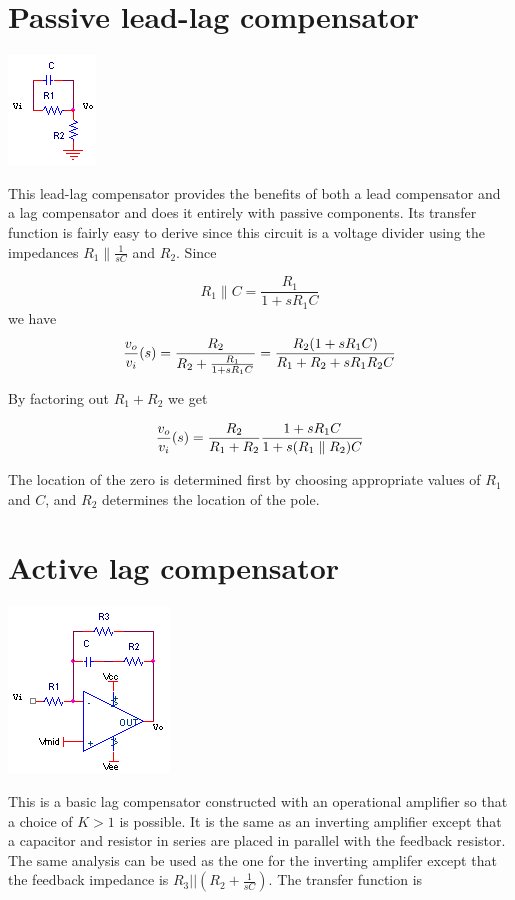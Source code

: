 \section{Passive lead-lag compensator}
\begin{center}
	\includegraphics{schematics/passiveleadlag.PNG}
\end{center}
This lead-lag compensator provides the benefits of both a lead compensator and a lag compensator and does it entirely with passive components. Its transfer function is fairly easy to derive since this circuit is a voltage divider using the impedances $R_1 \parallel \frac{1}{sC}$ and $R_2$.
Since

\begin{equation}
R_1 \parallel C = \frac{R_1}{1+sR_1 C}
\end{equation}
we have
\begin{equation}
\frac{v_o}{v_i}(s) = \frac{R_2}{R_2 + \frac{R_1}{1+sR_1 C}} = \frac{R_2(1+sR_1 C)}{R_1 + R_2 + sR_1 R_2 C}
\end{equation}

By factoring out $R_1 + R_2$ we get

\textcolor{red}{
\begin{equation}
\frac{v_o}{v_i}(s) = \frac{R_2}{R_1 + R_2}\frac{1+sR_1 C}{1+s(R_1 \parallel R_2)C}
\label{eq:passiveleadlag}
\end{equation}
}

The location of the zero is determined first by choosing appropriate values of $R_1$ and $C$, and $R_2$ determines the location of the pole.

\section{Active lag compensator}
\begin{center}
	\includegraphics{schematics/activelag.PNG}
\end{center}
This is a basic lag compensator constructed with an operational amplifier so that a choice of $K > 1$ is possible. It is the same as an inverting amplifier except that a capacitor and resistor in series are placed in parallel with the feedback resistor. The same analysis can be used as the one for the inverting amplifer except that the feedback impedance is $R_{3}||(R_{2}+\frac{1}{sC})$. The transfer function is

